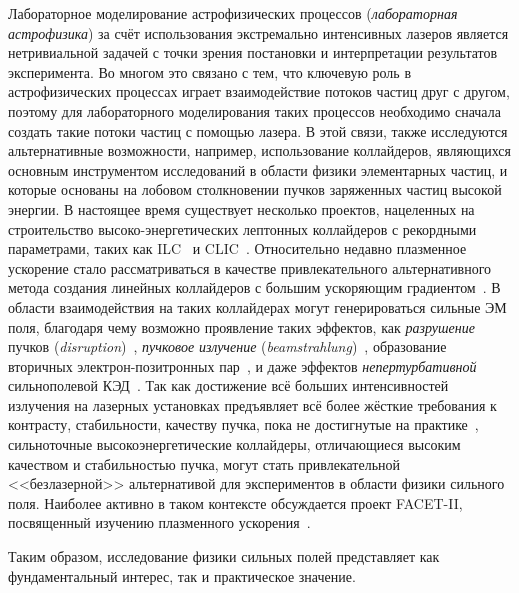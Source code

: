 Лабораторное моделирование астрофизических процессов (\textit{лабораторная астрофизика}) за счёт использования экстремально интенсивных лазеров является нетривиальной задачей с точки зрения постановки и интерпретации результатов эксперимента.
Во многом это связано с тем, что ключевую роль в астрофизических процессах играет взаимодействие потоков частиц друг с другом, поэтому для лабораторного моделирования таких процессов необходимо сначала создать такие потоки частиц с помощью лазера.
В этой связи, также исследуются альтернативные возможности, например, использование коллайдеров, являющихся основным инструментом исследований в области физики элементарных частиц, и которые основаны на лобовом столкновении пучков заряженных частиц высокой энергии.
В настоящее время существует несколько проектов, нацеленных на строительство высоко-энергетических лептонных коллайдеров с рекордными параметрами, таких как ILC~\cite{ILC} и CLIC~\cite{CLIC}.
Относительно недавно плазменное ускорение стало рассматриваться в качестве привлекательного альтернативного метода создания линейных коллайдеров с большим ускоряющим градиентом~\cite{schroeder2010physics}.
В области взаимодействия на таких коллайдерах могут генерироваться сильные ЭМ поля, благодаря чему возможно проявление таких эффектов, как \textit{разрушение} пучков (\textit{disruption})~\cite{hollebeek1981disruption,yokoya1992beam,chen1988disruption}, \textit{пучковое излучение} (\textit{beamstrahlung})~\cite{noble1987beamstrahlung,blankenbecler1987quantum,bell1995quantum}, образование вторичных электрон-позитронных пар~\cite{chen1989coherent,esberg2014strong}, и даже эффектов \textit{непертурбативной} сильнополевой КЭД~\cite{yakimenko2019prospect,tamburini2020efficient}.
Так как достижение всё больших интенсивностей излучения на лазерных установках предъявляет всё более жёсткие требования к контрасту, стабильности, качеству пучка, пока не достигнутые на практике~\cite{danson2019petawatt}, сильноточные высокоэнергетические коллайдеры, отличающиеся высоким качеством и стабильностью пучка, могут стать привлекательной <<безлазерной>> альтернативой для экспериментов в области физики сильного поля.
Наиболее активно в таком контексте обсуждается проект FACET-II, посвященный изучению плазменного ускорения~\cite{FACET, yakimenko2019prospect, del2019bright, meuren2019probing}.

Таким образом, исследование физики сильных полей представляет как фундаментальный интерес, так и практическое значение.


